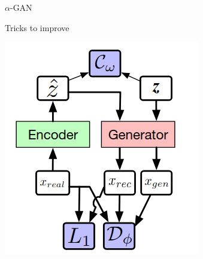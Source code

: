 \documentclass[compress]{beamer}
\begin{document}
\begin{frame}[allowframebreaks]{$\alpha$-GAN}
\begin{block}{Tricks to improve}
\begin{itemize}
        \end{itemize}
    \end{block}
    \includegraphics[scale=.4]{alphagan}
\end{frame}
\end{document}
